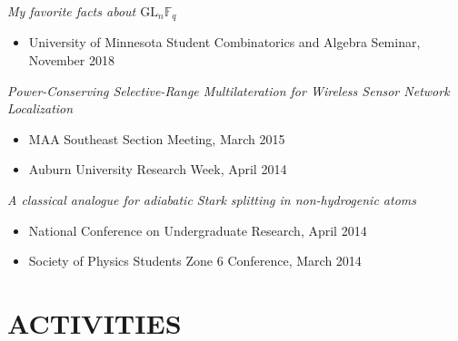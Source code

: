 \documentclass{res}
\begin{document}
\begin{resume}
{\it My favorite facts about \(\mathrm{GL}_n \mathbb{F}_q\)}
\begin{itemize}
\item University of Minnesota Student Combinatorics and Algebra Seminar, November 2018
\end{itemize}

{\it Power-Conserving Selective-Range Multilateration for Wireless Sensor Network Localization}
\begin{itemize}
\item MAA Southeast Section Meeting, March 2015
\item Auburn University Research Week, April 2014
\end{itemize}

{\it A classical analogue for adiabatic Stark splitting in non-hydrogenic atoms}
\begin{itemize}
\item National Conference on Undergraduate Research, April 2014
\item Society of Physics Students Zone 6 Conference, March 2014
\end{itemize}




\begin{comment}
\section{PROFESSIONAL and HONORARY MEMBERSHIP}
	\vspace{2mm}

Mathematical Association of America \textit{and the} American Mathematical Society

Auburn University Honors College

Auburn University Math Club: \textit{Vice President (Fall 2014 - Spring 2015)}

Auburn University Society of Physics Students: \textit{Treasurer (Fall 2012 - Spring 2013), Vice President (Fall 2013 - Spring 2014)}



\section{COMPUTER SKILLS}
	\vspace{2mm}   

	\LaTeX, SageMath, Python

\end{comment}


\section{ACTIVITIES}
	\vspace{2mm}


\end{resume}
\end{document}
